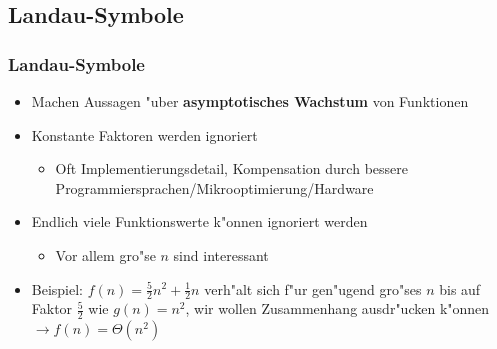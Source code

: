 \subsection{Landau-Symbole}
\begin{frame}
  \frametitle{Landau-Symbole}
  \begin{itemize}
  \item Machen Aussagen "uber \textbf{asymptotisches Wachstum} von Funktionen
  \item Konstante Faktoren werden ignoriert
    \begin{itemize}
    \item Oft Implementierungsdetail, Kompensation durch
          bessere Programmiersprachen/Mikrooptimierung/Hardware
    \end{itemize}
  \item Endlich viele Funktionswerte k"onnen ignoriert werden
    \begin{itemize}
    \item Vor allem gro"se $n$ sind interessant
    \end{itemize}
  \item Beispiel: $f(n) = \frac{5}{2}n^2 + \frac{1}{2}n$ verh"alt sich f"ur gen"ugend gro"ses
        $n$ bis auf Faktor $\frac{5}{2}$ wie $g(n) = n^2$, wir wollen
        Zusammenhang ausdr"ucken k"onnen \\[1em]
          $\rightarrow f(n) = \Theta(n^2)$
  \end{itemize}
\end{frame}

